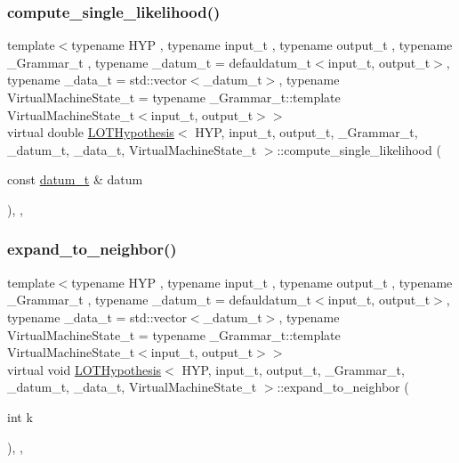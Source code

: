 \subsubsection{\texorpdfstring{compute\+\_\+single\+\_\+likelihood()}{compute\_single\_likelihood()}}
{\footnotesize\ttfamily template$<$typename H\+YP , typename input\+\_\+t , typename output\+\_\+t , typename \+\_\+\+Grammar\+\_\+t , typename \+\_\+datum\+\_\+t  = defauldatum\+\_\+t$<$input\+\_\+t, output\+\_\+t$>$, typename \+\_\+data\+\_\+t  = std\+::vector$<$\+\_\+datum\+\_\+t$>$, typename Virtual\+Machine\+State\+\_\+t  = typename \+\_\+\+Grammar\+\_\+t\+::template Virtual\+Machine\+State\+\_\+t$<$input\+\_\+t, output\+\_\+t$>$$>$ \\
virtual double \hyperlink{class_l_o_t_hypothesis}{L\+O\+T\+Hypothesis}$<$ H\+YP, input\+\_\+t, output\+\_\+t, \+\_\+\+Grammar\+\_\+t, \+\_\+datum\+\_\+t, \+\_\+data\+\_\+t, Virtual\+Machine\+State\+\_\+t $>$\+::compute\+\_\+single\+\_\+likelihood (\begin{DoxyParamCaption}\item[{const \hyperlink{class_l_o_t_hypothesis_ae36b1f113f45ee5ac82660028672739b}{datum\+\_\+t} \&}]{datum }\end{DoxyParamCaption})\hspace{0.3cm}{\ttfamily [inline]}, {\ttfamily [override]}, {\ttfamily [virtual]}}

\mbox{\label{class_l_o_t_hypothesis_ab24d0b8faa360f6a0edc4eefb17d6de7}} 
\subsubsection{\texorpdfstring{expand\+\_\+to\+\_\+neighbor()}{expand\_to\_neighbor()}}
{\footnotesize\ttfamily template$<$typename H\+YP , typename input\+\_\+t , typename output\+\_\+t , typename \+\_\+\+Grammar\+\_\+t , typename \+\_\+datum\+\_\+t  = defauldatum\+\_\+t$<$input\+\_\+t, output\+\_\+t$>$, typename \+\_\+data\+\_\+t  = std\+::vector$<$\+\_\+datum\+\_\+t$>$, typename Virtual\+Machine\+State\+\_\+t  = typename \+\_\+\+Grammar\+\_\+t\+::template Virtual\+Machine\+State\+\_\+t$<$input\+\_\+t, output\+\_\+t$>$$>$ \\
virtual void \hyperlink{class_l_o_t_hypothesis}{L\+O\+T\+Hypothesis}$<$ H\+YP, input\+\_\+t, output\+\_\+t, \+\_\+\+Grammar\+\_\+t, \+\_\+datum\+\_\+t, \+\_\+data\+\_\+t, Virtual\+Machine\+State\+\_\+t $>$\+::expand\+\_\+to\+\_\+neighbor (\begin{DoxyParamCaption}\item[{int}]{k }\end{DoxyParamCaption})\hspace{0.3cm}{\ttfamily [inline]}, {\ttfamily [override]}, {\ttfamily [virtual]}}




